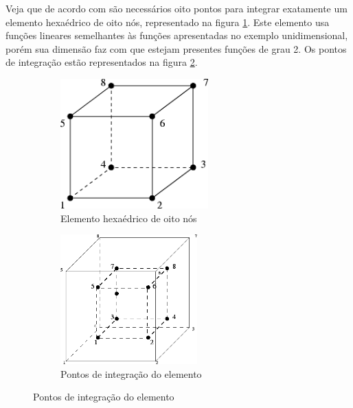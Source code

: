 Veja que de acordo com \cite{Paulo} são necessários oito pontos para integrar exatamente um elemento hexaédrico de oito nós, representado na figura \ref{fig:hexaoito}. Este elemento usa funções lineares semelhantes às funções apresentadas no exemplo unidimensional, porém sua dimensão faz com que estejam presentes funções de grau 2. Os pontos de integração estão representados na figura  \ref{fig:hexapontos}. \\
\begin{figure}
\caption{Elemento hexaédrico de oito nós e seus pontos de integração.}

\begin{subfigure}{0.5\textwidth}
\includegraphics[width=0.9\linewidth, height=5cm]{images/hexapointsofint.png}
    \caption{Elemento hexaédrico de oito nós}
    \label{fig:hexaoito}
\end{subfigure}
\begin{subfigure}{0.5\textwidth}
\includegraphics[width=0.9\linewidth, height=5cm]{images/hexaelement.png}
\caption{Pontos de integração do elemento}
\label{fig:hexapontos}
\end{subfigure}
\label{fig:hexaele}

\end{figure}

